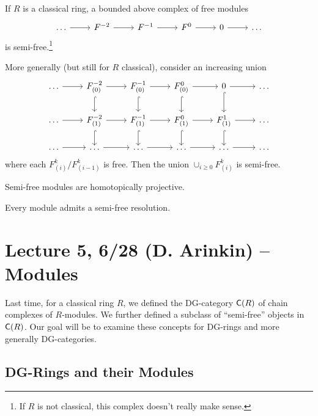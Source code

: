 \documentclass{amsart}
\begin{document}
\begin{ex}
	If $R$ is a classical ring, a bounded above complex of free modules
	\[
		\begin{tikzcd}
			\dots \rar & F^{-2} \rar & F^{-1} \rar & F^0 \rar & 0 \rar & \dots
		\end{tikzcd}
	\]
	is semi-free.\footnote{If $R$ is not classical, this complex doesn't really make sense.}
\end{ex}

\begin{ex}
	More generally (but still for $R$ classical), consider an increasing union
	\[
		\begin{tikzcd}
			\dots \rar & F_{(0)}^{-2} \rar \dar[hookrightarrow] & F_{(0)}^{-1} \rar \dar[hookrightarrow] & F_{(0)}^0 \rar \dar[hookrightarrow] & 0 \rar \dar[hookrightarrow] & \dots \\
			\dots \rar & F_{(1)}^{-2} \rar \dar[hookrightarrow] & F_{(1)}^{-1} \rar \dar[hookrightarrow] & F_{(1)}^0 \rar \dar[hookrightarrow] & F_{(1)}^{1} \rar \dar[hookrightarrow] & \dots \\
			\dots \rar & \dots \rar & \dots \rar & \dots \rar & \dots \rar & \dots
		\end{tikzcd}
	\]
	where each $F_{(i)}^k / F_{(i-1)}^k$ is free.
	Then the union $\cup_{i \geq 0} F_{(i)}^k$ is semi-free.
\end{ex}

\begin{prop}
	Semi-free modules are homotopically projective.
\end{prop}

\begin{prop}
	Every module admits a semi-free resolution.
\end{prop}

\section{Lecture 5, 6/28 (D. Arinkin) -- Modules}

Last time, for a classical ring $R$, we defined the DG-category $\mathsf{C}(R)$ of chain complexes of $R$-modules.
We further defined a subclass of ``semi-free'' objects in $\mathsf{C}(R)$.
Our goal will be to examine these concepts for DG-rings and more generally DG-categories.

\subsection{DG-Rings and their Modules}
\end{document}
